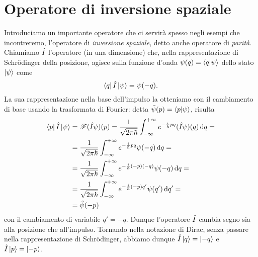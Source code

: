 \section{Operatore di inversione spaziale}
Introduciamo un importante operatore che ci servirà spesso negli esempi che incontreremo, l'operatore di \emph{inversione spaziale}, detto anche operatore di \emph{parità}.
Chiamiamo $\hat{I}$ l'operatore (in una dimensione) che, nella rappresentazione di Schr\"odinger della posizione, agisce sulla funzione d'onda $\psi(q)=\left\langle{q}\middle|{\psi}\right\rangle$ dello stato $\left|{\psi}\right\rangle$ come
\begin{equation}
	\left\langle{q}\right|\hat{I}\left|{\psi}\right\rangle=\psi(-q).
	\label{eq:inversione-spaziale-posizione}
\end{equation}
La sua rappresentazione nella base dell'impulso la otteniamo con il cambiamento di base usando la trasformata di Fourier: detta $\tilde{\psi}(p)=\left\langle{p}\middle|{\psi}\right\rangle$, risulta
\begin{equation}
	\begin{split}
		\left\langle{p}\right|\hat{I}\left|{\psi}\right\rangle&=\operatorname{\mathscr{F}}(\hat{I}\psi)(p)=\frac1{\sqrt{2\pi\hbar}}\int_{-\infty}^{+\infty}e^{-\frac{i}{\hbar}pq}(\hat{I}\psi)(q)\,\textup{d} q=\\
		&=\frac1{\sqrt{2\pi\hbar}}\int_{-\infty}^{+\infty}e^{-\frac{i}{\hbar}pq}\psi(-q)\,\textup{d} q=\\
		&=\frac1{\sqrt{2\pi\hbar}}\int_{-\infty}^{+\infty}e^{-\frac{i}{\hbar}(-p)(-q)}\psi(-q)\,\textup{d} q=\\
		&=\frac1{\sqrt{2\pi\hbar}}\int_{-\infty}^{+\infty}e^{-\frac{i}{\hbar}(-p)q'}\psi(q')\,\textup{d} q'=\\
		&=\tilde{\psi}(-p)
	\end{split}
	\label{eq:inversione-spaziale-impulso}
\end{equation}
con il cambiamento di variabile $q'=-q$.
Dunque l'operatore $\hat{I}$ cambia segno sia alla posizione che all'impulso.
Tornando nella notazione di Dirac, senza passare nella rappresentazione di Schr\"odinger, abbiamo dunque $\hat{I}\left|{q}\right\rangle=\left|{-q}\right\rangle$ e $\hat{I}\left|{p}\right\rangle=\left|{-p}\right\rangle$.

